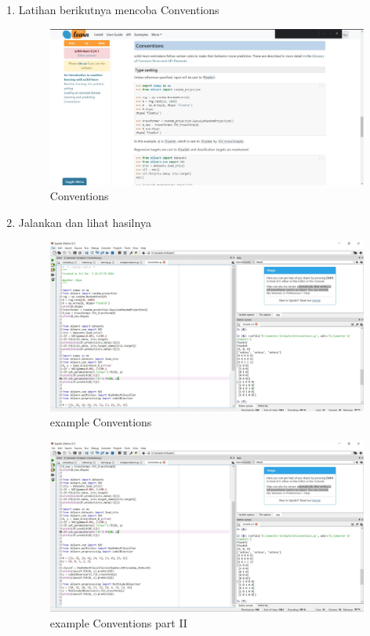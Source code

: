 \begin{enumerate}
        \item Latihan berikutnya mencoba Conventions
        \begin{figure}[H]
		\centering
		\includegraphics[width=1\textwidth]{figures/1184095/chapter1/10 awal.JPG} 
		\caption{Conventions}
		\label{print}
		\end{figure}
	
        \item Jalankan dan lihat hasilnya
        \begin{figure}[H]
		\centering
		\includegraphics[width=1\textwidth]{figures/1184095/chapter1/11.JPG} 
		\caption{example Conventions}
		\label{print}
		\end{figure}
		
        \begin{figure}[H]
		\centering
		\includegraphics[width=1\textwidth]{figures/1184095/chapter1/11 part 2.JPG}
		\caption{example Conventions part II}
		\label{print}
		\end{figure}
\end{enumerate}

